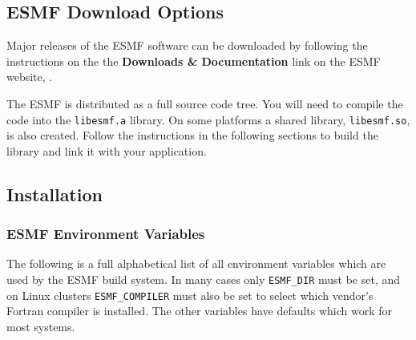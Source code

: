 
\subsection{ESMF Download Options}

Major releases of the ESMF software can be downloaded by following
the instructions on the 
the {\bf Downloads \& Documentation} link on the ESMF 
website, .

The ESMF is distributed as a full source code tree.  You will need
to compile the code into the {\tt libesmf.a} library.
On some platforms a shared library, {\tt libesmf.so}, is also created.
Follow the instructions in the following sections
to build the library and link it with your application.

\subsection{Installation}
\label{InstallProcedures}



\subsubsection{ESMF Environment Variables}
\label{EnvironmentVariables}

The following is a full alphabetical list of all environment variables which
are used by the ESMF build system.  In many cases only {\tt ESMF\_DIR}
must be set, and on Linux clusters {\tt ESMF\_COMPILER} must also be
set to select which vendor's Fortran compiler is installed.
The other variables have defaults which work for most systems.

